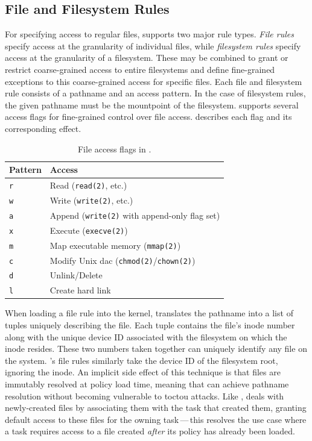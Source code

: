 \subsection{File and Filesystem Rules}

For specifying access to regular files, \bpfcontain{} supports two major rule types.
\textit{File rules} specify access at the granularity of individual files, while
\textit{filesystem rules} specify access at the granularity of a filesystem.  These may be
combined to grant or restrict coarse-grained access to entire filesystems and define
fine-grained exceptions to this coarse-grained access for specific files. Each file and
filesystem rule consists of a pathname and an access pattern. In the case of filesystem
rules, the given pathname must be the mountpoint of the filesystem. \bpfcontain{} supports
several access flags for fine-grained control over file access.
 describes each flag and its corresponding effect.

\begin{table}[htbp]
  \centering
  \caption[File access flags in \bpfcontain{}]{
    File access flags in \bpfcontain{}.
  }%
  \label{tab:bpfcontain-file-access}
  \begin{tabular}{ll}
  \toprule
  Pattern & Access \\
  \midrule
  \texttt{r} & Read (\texttt{read(2)}, etc.) \\
  \texttt{w} & Write (\texttt{write(2)}, etc.)\\
  \texttt{a} & Append (\texttt{write(2)} with append-only flag set) \\
  \texttt{x} & Execute (\texttt{execve(2)})\\
  \texttt{m} & Map executable memory (\texttt{mmap(2)}) \\
  \texttt{c} & Modify Unix \gls{dac} (\texttt{chmod(2)}/\texttt{chown(2)}) \\
  \texttt{d} & Unlink/Delete \\
  \texttt{l} & Create hard link \\
  \bottomrule
  \end{tabular}
\end{table}

When loading a file rule into the kernel, \bpfcontain{} translates the pathname into
a list of tuples uniquely describing the file. Each tuple contains the file's inode number
along with the unique device ID associated with the filesystem on which the inode resides.
These two numbers taken together can uniquely identify any file on the system.
\bpfcontain{}'s file rules similarly take the device ID of the filesystem root, ignoring
the inode. An implicit side effect of this technique is that files are immutably resolved
at policy load time, meaning that \bpfcontain{} can achieve pathname resolution without
becoming vulnerable to \gls{toctou} attacks. Like \bpfbox{}, \bpfcontain{} deals with
newly-created files by associating them with the task that created them, granting default
access to these files for the owning task\,---\,this resolves the use case where a task
requires access to a file created \textit{after} its policy has already been loaded.

